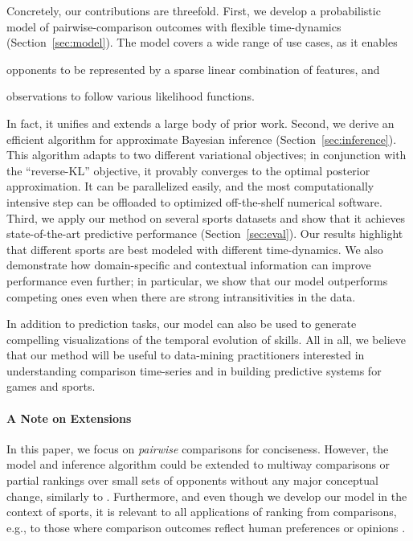 Concretely, our contributions are threefold.
First, we develop a probabilistic model of pairwise-comparison outcomes with flexible time-dynamics (Section~\ref{sec:model}).
The model covers a wide range of use cases, as it enables
\begin{enuminline}
\item opponents to be represented by a sparse linear combination of features, and
\item observations to follow various likelihood functions.
\end{enuminline}
In fact, it unifies and extends a large body of prior work.
Second, we derive an efficient algorithm for approximate Bayesian inference (Section~\ref{sec:inference}).
This algorithm adapts to two different variational objectives;
in conjunction with the ``reverse-KL'' objective, it provably converges to the optimal posterior approximation.
It can be parallelized easily, and the most computationally intensive step can be offloaded to optimized off-the-shelf numerical software.
Third, we apply our method on several sports datasets and show that it achieves state-of-the-art predictive performance (Section~\ref{sec:eval}).
Our results highlight that different sports are best modeled with different time-dynamics.
We also demonstrate how domain-specific and contextual information can improve performance even further;
in particular, we show that our model outperforms competing ones even when there are strong intransitivities in the data.

In addition to prediction tasks, our model can also be used to generate compelling visualizations of the temporal evolution of skills.
All in all, we believe that our method will be useful to data-mining practitioners interested in understanding comparison time-series and in building predictive systems for games and sports.

\paragraph{A Note on Extensions}
In this paper, we focus on \emph{pairwise} comparisons for conciseness.
However, the model and inference algorithm could be extended to multiway comparisons or partial rankings over small sets of opponents without any major conceptual change, similarly to \citet{herbrich2006trueskill}.
Furthermore, and even though we develop our model in the context of sports, it is relevant to all applications of ranking from comparisons, e.g., to those where comparison outcomes reflect human preferences or opinions \citep{thurstone1927law, mcfadden1973conditional, salganik2015wiki}.
